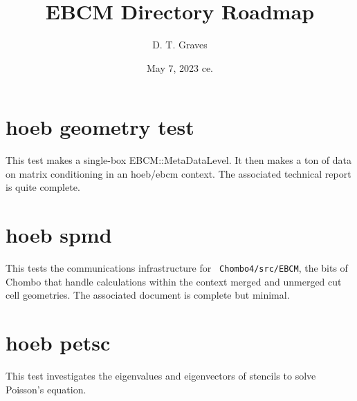 \documentclass{article}
\begin{document}
\title{EBCM Directory Roadmap}
\author{
    D. T. Graves    \footnotemark[1]
        }
\date{May 7, 2023 ce.}
\maketitle

\section{hoeb geometry test}

This test makes a single-box EBCM::MetaDataLevel.  It then makes a ton
of data on matrix conditioning in an hoeb/ebcm context.    The
associated technical report is quite complete.

\section{hoeb spmd}

This tests the communications infrastructure for {\tt
Chombo4/src/EBCM}, the bits of Chombo that handle calculations
within the context merged and
unmerged cut cell geometries.   The associated document is complete
but minimal.


\section{hoeb petsc}

This test investigates the eigenvalues and eigenvectors of stencils to
solve Poisson's equation.
\end{document}
